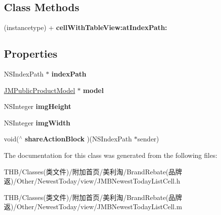\subsection*{Class Methods}
\begin{DoxyCompactItemize}
\item 
\mbox{\label{interface_j_m_b_newest_today_list_cell_aac866abbe6039da7a1140491c9a5c57a}} 
(instancetype) + {\bfseries cell\+With\+Table\+View\+:at\+Index\+Path\+:}
\end{DoxyCompactItemize}
\subsection*{Properties}
\begin{DoxyCompactItemize}
\item 
\mbox{\label{interface_j_m_b_newest_today_list_cell_a6783ac76be30e40ddc43f5431c8e6388}} 
N\+S\+Index\+Path $\ast$ {\bfseries index\+Path}
\item 
\mbox{\label{interface_j_m_b_newest_today_list_cell_aa5a6c56c1f009dcacca9ce3e416f97bc}} 
\mbox{\hyperlink{interface_j_m_public_product_model}{J\+M\+Public\+Product\+Model}} $\ast$ {\bfseries model}
\item 
\mbox{\label{interface_j_m_b_newest_today_list_cell_a92b340f037172023b42d517120049dd2}} 
N\+S\+Integer {\bfseries img\+Height}
\item 
\mbox{\label{interface_j_m_b_newest_today_list_cell_a724d5e765b9bf1db623e92055ff52ba9}} 
N\+S\+Integer {\bfseries img\+Width}
\item 
\mbox{\label{interface_j_m_b_newest_today_list_cell_a94a6c0d710279b0bf34759d385f1daa5}} 
void($^\wedge$ {\bfseries share\+Action\+Block} )(N\+S\+Index\+Path $\ast$sender)
\end{DoxyCompactItemize}


The documentation for this class was generated from the following files\+:\begin{DoxyCompactItemize}
\item 
T\+H\+B/\+Classes(类文件)/附加首页/美利淘/\+Brand\+Rebate(品牌返)/\+Other/\+Newest\+Today/view/J\+M\+B\+Newest\+Today\+List\+Cell.\+h\item 
T\+H\+B/\+Classes(类文件)/附加首页/美利淘/\+Brand\+Rebate(品牌返)/\+Other/\+Newest\+Today/view/J\+M\+B\+Newest\+Today\+List\+Cell.\+m\end{DoxyCompactItemize}
